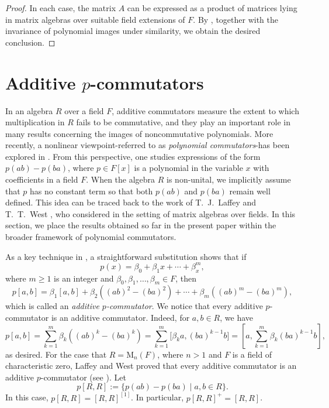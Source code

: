 \documentclass[11pt]{article}
\theoremstyle{definition}
\begin{document}
{{{{\begin{proof}
					In each case, the matrix \( A \) can be expressed as a product of matrices lying in matrix algebras over suitable field extensions of \( F \). By \cite[Theorem 1]{Pa_Ma_14}, together with the invariance of polynomial images under similarity, we obtain the desired conclusion.
				\end{proof}
				
				\section{Additive $p$-commutators}\label{sec po}
				
				In an algebra $R$ over a field $F$, additive commutators measure the extent to which multiplication in $R$ fails to be commutative, and they play an important role in many results concerning the images of noncommutative polynomials. More recently, a nonlinear viewpoint-referred to as \textit{polynomial commutators}-has been explored in \cite{Pa_Du_25-1}. From this perspective, one studies expressions of the form $p(ab) - p(ba)$, where $p \in F[x]$ is a polynomial in the variable $x$ with coefficients in a field $F$. When the algebra $R$ is non-unital, we implicitly assume that $p$ has no constant term so that both $p(ab)$ and $p(ba)$ remain well defined. This idea can be traced back to the work of T.~J.~Laffey and T.~T.~West \cite{Pa_LaWe_93}, who considered in the setting of matrix algebras over fields. In this section, we place the results obtained so far in the present paper within the broader framework of polynomial commutators.
				
				As a key technique in \cite{Pa_Du_25-1}, a straightforward substitution shows that if
				\[
				p(x) = \beta_0+\beta_1x +\cdots +\beta_ x^m,
				\]
				where $m \ge 1$ is an integer and $\beta_0, \beta_1,\ldots,\beta_m \in F$, then
				\[
				p[a,b] = \beta_1[a,b] +\beta_2((ab)^2 - (ba)^2) + \cdots +\beta_m((ab)^m - (ba)^m),
				\]
				which is called an {\it additive $p$-commutator}. We notice that every additive $p$-commutator is an additive commutator.
				Indeed, for $a, b\in R$, we have
				\begin{equation}
					p[a,b] =\sum_{k=1}^m\beta_k((ab)^k - (ba)^k)=\sum_{k=1}^m\big[\beta_ka, (ba)^{k-1}b\big]=\left[a, \sum_{k=1}^m\beta_k(ba)^{k-1}b\right],\label{add}
				\end{equation}
				as desired. For the case that $R=\text{M}_n(F)$, where $n>1$ and $F$ is a field of characteristic zero,
				Laffey and West proved that every additive commutator is an additive $p$-commutator (see \cite{Pa_LaWe_93}). Let
				$$
				p[R, R]:=\{p(ab)-p(ba)\mid a, b\in R\}.
				$$
				In this case, $p[R, R]=[R, R]^{[1]}$. In particular, $p[R, R]^+=[R, R]$.

}}}}
\end{document}

